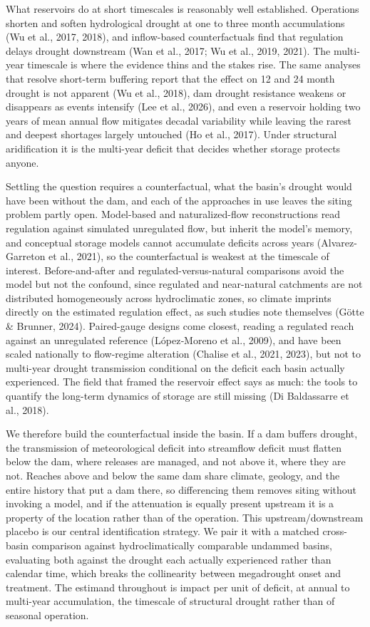 \documentclass[
]{agujournal2019}
\begin{document}
What reservoirs do at short timescales is reasonably well established.
Operations shorten and soften hydrological drought at one to three month
accumulations (Wu et al., 2017, 2018), and inflow-based counterfactuals
find that regulation delays drought downstream (Wan et al., 2017; Wu et
al., 2019, 2021). The multi-year timescale is where the evidence thins
and the stakes rise. The same analyses that resolve short-term buffering
report that the effect on 12 and 24 month drought is not apparent (Wu et
al., 2018), dam drought resistance weakens or disappears as events
intensify (Lee et al., 2026), and even a reservoir holding two years of
mean annual flow mitigates decadal variability while leaving the rarest
and deepest shortages largely untouched (Ho et al., 2017). Under
structural aridification it is the multi-year deficit that decides
whether storage protects anyone.

Settling the question requires a counterfactual, what the basin's
drought would have been without the dam, and each of the approaches in
use leaves the siting problem partly open. Model-based and
naturalized-flow reconstructions read regulation against simulated
unregulated flow, but inherit the model's memory, and conceptual storage
models cannot accumulate deficits across years (Alvarez-Garreton et al.,
2021), so the counterfactual is weakest at the timescale of interest.
Before-and-after and regulated-versus-natural comparisons avoid the
model but not the confound, since regulated and near-natural catchments
are not distributed homogeneously across hydroclimatic zones, so climate
imprints directly on the estimated regulation effect, as such studies
note themselves (Götte \& Brunner, 2024). Paired-gauge designs come
closest, reading a regulated reach against an unregulated reference
(López‐Moreno et al., 2009), and have been scaled nationally to
flow-regime alteration (Chalise et al., 2021, 2023), but not to
multi-year drought transmission conditional on the deficit each basin
actually experienced. The field that framed the reservoir effect says as
much: the tools to quantify the long-term dynamics of storage are still
missing (Di Baldassarre et al., 2018).

We therefore build the counterfactual inside the basin. If a dam buffers
drought, the transmission of meteorological deficit into streamflow
deficit must flatten below the dam, where releases are managed, and not
above it, where they are not. Reaches above and below the same dam share
climate, geology, and the entire history that put a dam there, so
differencing them removes siting without invoking a model, and if the
attenuation is equally present upstream it is a property of the location
rather than of the operation. This upstream/downstream placebo is our
central identification strategy. We pair it with a matched cross-basin
comparison against hydroclimatically comparable undammed basins,
evaluating both against the drought each actually experienced rather
than calendar time, which breaks the collinearity between megadrought
onset and treatment. The estimand throughout is impact per unit of
deficit, at annual to multi-year accumulation, the timescale of
structural drought rather than of seasonal operation.
\end{document}
